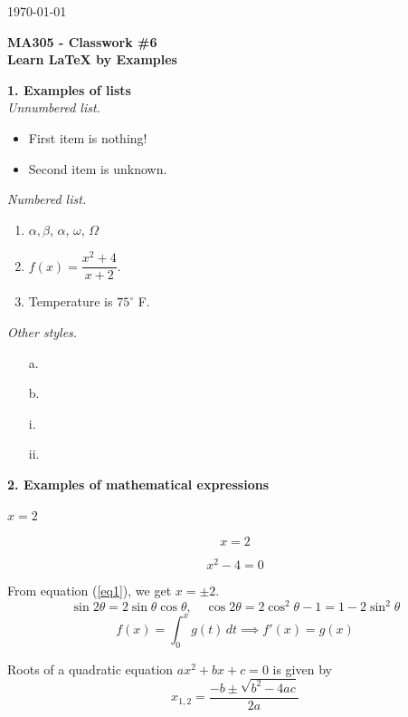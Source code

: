 \documentclass[12pt]{article}
\author{khanal}
\begin{document}
\hfill \today

\begin{center}
\textbf{\Large MA305 - Classwork \#6\\
	 \large Learn LaTeX by Examples}
\end{center}

\noindent \hrulefill

\noindent \textbf{1. Examples of lists}\\
 
\textit{Unnumbered list.}
\begin{itemize}
\item First item is nothing!
\item Second item is unknown.
\end{itemize}

\vspace{0.25in}

\textit{Numbered list.} 
\begin{enumerate}
\item $\alpha, \beta$, $\alpha$, $\omega$, $\Omega$
\item $f(x)=\dfrac{x^2+4}{x+2}$.
\item Temperature is $75^\circ$ F.
\end{enumerate}

\vspace{0.25in}

\textit{Other styles.}  
\begin{enumerate}
\item[a.] 
\item[b.] 
\end{enumerate}

\begin{itemize}
\item[i.] 
\item[ii.] 
\end{itemize}


\newpage
\noindent \textbf{2. Examples of mathematical expressions} 


$x=2$

\[ x=2\] 

\begin{equation}\label{eq1}
x^2-4=0
\end{equation}

From equation (\ref{eq1}), we get $x=\pm 2$.
%
\[\sin2\theta = 2\sin\theta\cos\theta, \quad \cos2\theta = 2\cos^2\theta -1 =1 -2\sin^2\theta\]
%
$$f(x)=\int_0^x g(t)\, dt \implies f'(x) = g(x)$$

Roots of a quadratic equation $ax^2+bx+c=0$ is given by 
\begin{equation}
x_{1,2}=\frac{-b\pm \sqrt{b^2-4ac}}{2a}
\end{equation} 
\end{document}
